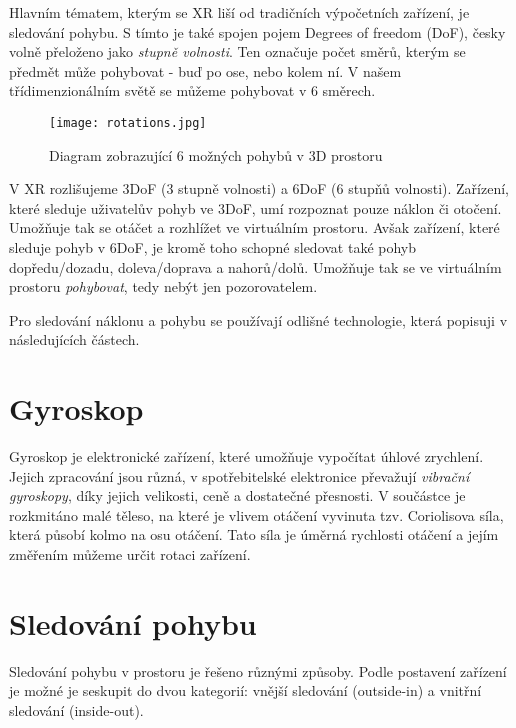 Hlavním tématem, kterým se XR liší od tradičních výpočetních zařízení, je sledování pohybu. S tímto je také spojen pojem Degrees of freedom (DoF), česky volně přeloženo jako \textit{stupně volnosti}. Ten označuje počet směrů, kterým se předmět může pohybovat - buď po ose, nebo kolem ní. V našem třídimenzionálním světě se můžeme pohybovat v 6 směrech. \cite{mechatech_3dof_6dof}

\begin{figure}[H]
    \centering
    \texttt{[image: rotations.jpg]}
    \caption{Diagram zobrazující 6 možných pohybů v 3D prostoru \cite{nasa_aircraft}}
    \label{rotations_nasa_fig}
\end{figure}

V XR rozlišujeme 3DoF (3 stupně volnosti) a 6DoF (6 stupňů volnosti). Zařízení, které sleduje uživatelův pohyb ve 3DoF, umí rozpoznat pouze náklon či otočení. Umožňuje tak se otáčet a rozhlížet ve virtuálním prostoru. Avšak zařízení, které sleduje pohyb v 6DoF, je kromě toho schopné sledovat také pohyb dopředu/dozadu, doleva/doprava a nahorů/dolů. Umožňuje tak se ve virtuálním prostoru \textit{pohybovat}, tedy nebýt jen pozorovatelem. \cite{mechatech_3dof_6dof}

Pro sledování náklonu a pohybu se používají odlišné technologie, která popisuji v následujících částech.

\section{Gyroskop}

Gyroskop je elektronické zařízení, které umožňuje vypočítat úhlové zrychlení. Jejich zpracování jsou různá, v spotřebitelské elektronice převažují \textit{vibrační gyroskopy}, díky jejich velikosti, ceně a dostatečné přesnosti. V součástce je rozkmitáno malé těleso, na které je vlivem otáčení vyvinuta tzv. Coriolisova síla, která působí kolmo na osu otáčení. Tato síla je úměrná rychlosti otáčení a jejím změřením můžeme určit rotaci zařízení. \cite{Electricity_Magnetism} \cite{techmania_coriolis}

\section{Sledování pohybu}

Sledování pohybu v prostoru je řešeno různými způsoby. Podle postavení zařízení je možné je seskupit do dvou kategorií: vnější sledování (outside-in) a vnitřní sledování (inside-out).

